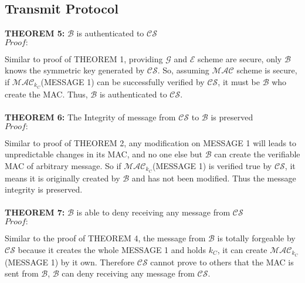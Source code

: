 \subsection{Transmit Protocol}
\textbf{THEOREM 5:} $\mathcal{B}$ is authenticated to $\mathcal{CS}$ \\
\emph{$Proof:$} \par
Similar to proof of THEOREM 1, providing $\mathcal{G}$ and $\mathcal{E}$ scheme are secure, only $\mathcal{B}$ knows the symmetric key generated by $\mathcal{CS}$. So, assuming $\mathcal{MAC}$ scheme is secure, if $\mathcal{MAC}_{k_C}$(MESSAGE 1) can be successfully verified by $\mathcal{CS}$, it must be $\mathcal{B}$ who create the MAC. Thus, $\mathcal{B}$ is authenticated to $\mathcal{CS}$.
\\
\\
\textbf{THEOREM 6:} The Integrity of message from $\mathcal{CS}$ to $\mathcal{B}$ is preserved \\
\emph{$Proof:$} \par
Similar to proof of THEOREM 2, any modification on MESSAGE 1 will leads to unpredictable changes in its MAC, and no one else but $\mathcal{B}$ can create the verifiable MAC of arbitrary message. So if $\mathcal{MAC}_{k_C}$(MESSAGE 1) is verified true by $\mathcal{CS}$, it means it is originally created by $\mathcal{B}$ and has not been modified. Thus the message integrity is preserved.
\\
\\
\textbf{THEOREM 7:} $\mathcal{B}$ is able to deny receiving any message from $\mathcal{CS}$ \\
\emph{$Proof:$} \par
Similar to the proof of THEOREM 4, the message from $\mathcal{B}$ is totally forgeable by $\mathcal{CS}$ because it creates the whole MESSAGE 1 and holds $k_C$, it can create $\mathcal{MAC}_{k_C}$(MESSAGE 1) by it own. Therefore $\mathcal{CS}$ cannot prove to others that the MAC is sent from $\mathcal{B}$, $\mathcal{B}$ can deny receiving any message from $\mathcal{CS}$.


